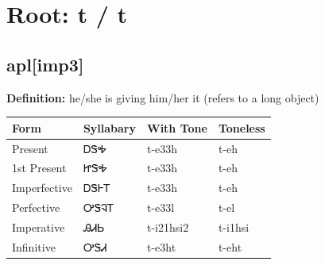 \documentclass{article}%
\begin{document}
%
\normalsize%
\section*{Root: t / t}%
\subsection*{apl[imp3]}%
\textbf{Definition: }%
he/she is giving him/her it (refers to a long object)%
\\[0.5em]%
\begin{tabular}{|l|l|l|l|}%
\hline%
\textbf{Form}&\textbf{Syllabary}&\textbf{With Tone}&\textbf{Toneless}\\%
\hline%
Present&ᎠᏕᎭ&t{-}e33h&t{-}eh\\%
1st Present&ᏥᏕᎭ&t{-}e33h&t{-}eh\\%
Imperfective&ᎠᏕᎰᎢ&t{-}e33h&t{-}eh\\%
Perfective&ᎤᏕᎸᎢ&t{-}e33l&t{-}el\\%
Imperative&ᎯᏗᏏ&t{-}i21hsi2&t{-}i1hsi\\%
Infinitive&ᎤᏕᏗ&t{-}e3ht&t{-}eht\\%
\hline%
\end{tabular}%
\\[1em]%
\end{document}

